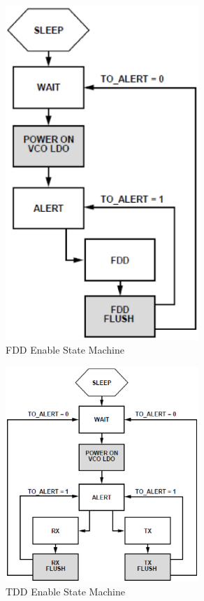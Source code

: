 \begin{figure}[htbp]
    \centering
    \includegraphics[width=0.65\textwidth]{./figures/fdd_ensm}
    \caption{ FDD Enable State Machine
    \label{fig:pll}}
\end{figure}

\begin{figure}[htbp]
    \centering
    \includegraphics[width=0.65\textwidth]{./figures/tdd_ensm}
    \caption{ TDD Enable State Machine
    \label{fig:pll}}
\end{figure}


